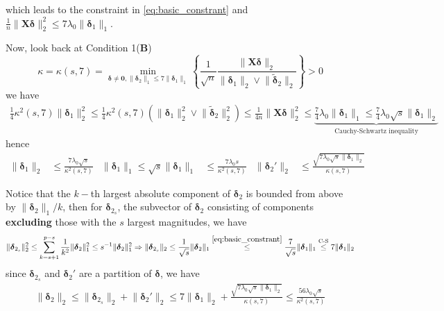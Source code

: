 \documentclass[twoside]{article}
\begin{document}
which leads to the constraint in \ref{eq:basic_constrant} and $\frac{1}{n}\lVert \mathbf{X}\boldsymbol{\delta} \rVert ^2_2 \leq 7\lambda_0 \lVert \boldsymbol{\delta}_1 \rVert _1$.

Now, look back at Condition 1(\textbf{B})
$$
\kappa = \kappa(s,7) = \min_{\boldsymbol{\delta}\neq \mathbf{0}, \lVert\boldsymbol{\delta}_2\rVert _1 \leq 7 \lVert\boldsymbol{\delta}_1\rVert _1} \left\{ \frac{1}{\sqrt{n}}\frac{\lVert\mathbf{X}\boldsymbol{\delta}\rVert _2}{\lVert\boldsymbol{\delta}_1\rVert _2 \vee \lVert\tilde{\boldsymbol{\delta}}_2\rVert _2} \right\} > 0
$$
we have 
\begin{align*}
    \frac{1}{4}\kappa^2(s,7)\lVert\boldsymbol{\delta}_1\rVert^2_2 \leq \frac{1}{4}\kappa^2(s,7)\left( \lVert\boldsymbol{\delta}_1\rVert^2_2 \vee \lVert\tilde{\boldsymbol{\delta}}_2\rVert^2_2 \right)\leq \frac{1}{4n}\lVert\mathbf{X}\boldsymbol{\delta}\rVert^2_2\leq \underbrace{\frac{7}{4}\lambda_0 \lVert \boldsymbol{\delta}_1 \rVert _1 \leq \frac{7}{4}\lambda_0\sqrt{s} \lVert \boldsymbol{\delta}_1 \rVert _2 }_{\text{Cauchy-Schwartz inequality}}
\end{align*}
hence
\begin{align*}
    \lVert\boldsymbol{\delta}_1\rVert _2 &\leq \frac{7\lambda_0 \sqrt{s}}{\kappa^2(s,7)} & \lVert\boldsymbol{\delta}_1\rVert _1\leq \sqrt{s} \lVert\boldsymbol{\delta}_1\rVert _1 &\leq \frac{7\lambda_0 s}{\kappa^2(s,7)} & \lVert\boldsymbol{\delta}_2'\rVert _2 &\leq \frac{\sqrt{7\lambda_0 \sqrt{s} \lVert \boldsymbol{\delta}_1 \rVert _2}}{\kappa(s,7)}
\end{align*}

Notice that the $k-$th largest absolute component of $\boldsymbol{\delta}_2$ is bounded from above by $\lVert\boldsymbol{\delta}_2\rVert _1/k$, then for $\boldsymbol{\delta}_{2_s}$, the subvector of $\boldsymbol{\delta}_2$ consisting of components \textbf{excluding} those with the $s$ largest magnitudes, we have
$$
\lVert\boldsymbol{\delta}_{2_s}\rVert _2^2\leq  \sum^{p-s}_{k=s+1}\frac{1}{k^2} \lVert\boldsymbol{\delta}_2\rVert^2 _1 \leq s^{-1}\lVert\boldsymbol{\delta}_2\rVert _1^2 \Rightarrow \lVert\boldsymbol{\delta}_{2_s}\rVert _2 \leq \frac{1}{\sqrt{s}}\lVert\boldsymbol{\delta}_2\rVert _1  \overset{\ref{eq:basic_constrant}}{\leq} \frac{7}{\sqrt{s}}\lVert\boldsymbol{\delta}_1\rVert _1 \overset{\text{C-S}}{\leq} 7\lVert\boldsymbol{\delta}_1\rVert _2
$$
since $\boldsymbol{\delta}_{2_s}$ and $\boldsymbol{\delta}_{2}'$ are a partition of $\boldsymbol{\delta}$, we have 
\begin{align*}
    \lVert\boldsymbol{\delta}_2\rVert _2 \leq \lVert\boldsymbol{\delta}_{2_s}\rVert _2 + \lVert\boldsymbol{\delta}_2'\rVert _2 \leq 7 \lVert\boldsymbol{\delta}_1\rVert _2 + \frac{\sqrt{7\lambda_0 \sqrt{s} \lVert \boldsymbol{\delta}_1 \rVert _2}}{\kappa(s,7)}\leq  \frac{56\lambda_0 \sqrt{s}}{\kappa^2(s,7)} 
\end{align*}
\end{document}
